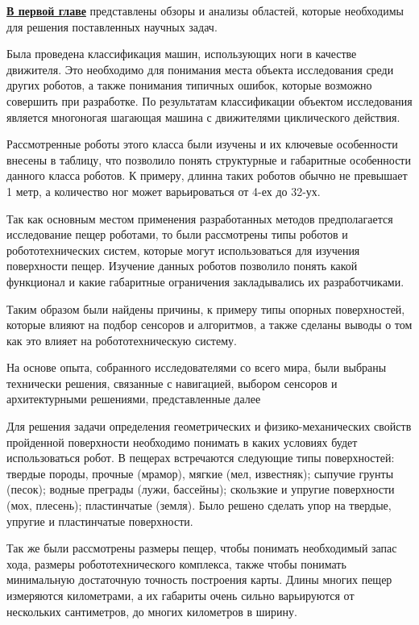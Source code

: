 
\textbf{\underline{В первой главе}} представлены обзоры и анализы областей, которые необходимы для решения поставленных научных задач.

Была проведена классификация машин, использующих ноги в качестве движителя. Это необходимо для понимания места объекта исследования среди других роботов, а также понимания типичных ошибок, которые возможно совершить при разработке. По результатам классификации объектом исследования является многоногая шагающая машина с движителями циклического действия.

Рассмотренные роботы этого класса были изучены и их ключевые особенности внесены в таблицу, что позволило понять структурные и габаритные особенности данного класса роботов. К примеру, длинна таких роботов обычно не превышает 1 метр, а количество ног может варьироваться от 4-ех до 32-ух.

Так как основным местом применения разработанных методов предполагается исследование пещер роботами, то были рассмотрены типы роботов и робототехнических систем, которые могут использоваться для изучения поверхности пещер. Изучение данных роботов позволило понять какой функционал и какие габаритные ограничения закладывались их разработчиками.

Таким образом были найдены причины, к примеру типы опорных поверхностей, которые влияют на подбор сенсоров и алгоритмов, а также сделаны выводы о том как это влияет на робототехническую систему. 

На основе опыта, собранного исследователями со всего мира, были выбраны технически решения, связанные с навигацией, выбором сенсоров и архитектурными решениями, представленные далее

Для решения задачи определения геометрических и физико-механических свойств пройденной поверхности необходимо понимать в каких условиях будет использоваться робот. В пещерах встречаются следующие типы поверхностей: твердые породы, прочные (мрамор), мягкие (мел, известняк); сыпучие грунты (песок); водные преграды (лужи, бассейны); скользкие и упругие поверхности (мох, плесень); пластинчатые (земля). Было решено сделать упор на твердые, упругие и пластинчатые поверхности.

Так же были рассмотрены размеры пещер, чтобы понимать необходимый запас хода, размеры робототехнического комплекса, также чтобы понимать минимальную достаточную точность построения карты. Длины многих пещер измеряются километрами, а их габариты очень сильно варьируются от нескольких сантиметров, до многих километров в ширину.

